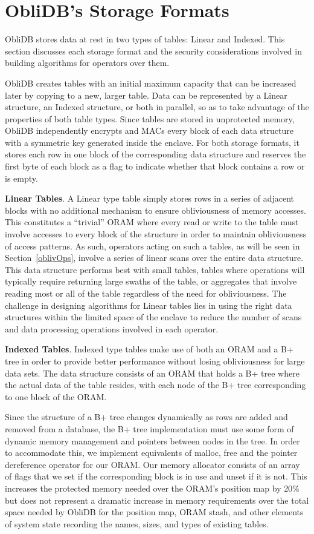 \documentclass[letterpaper,twocolumn,10pt]{article}
\def\name/{ObliDB}
\begin{document}
\section{\name/'s Storage Formats}\label{oblivData}
\name/ stores data at rest in two types of tables: Linear and Indexed. This section discusses each storage format and the security considerations involved in building algorithms for operators over them.

\name/ creates tables with an initial maximum capacity that can be increased later by copying to a new, larger table. Data can be represented by a Linear structure, an Indexed structure, or both in parallel, so as to take advantage of the properties of both table types. Since tables are stored in unprotected memory, \name/ independently encrypts and MACs every block of each data structure with a symmetric key generated inside the enclave. For both storage formats, it stores each row in one block of the corresponding data structure and reserves the first byte of each block as a flag to indicate whether that block contains a row or is empty.

 \noindent \textbf{Linear Tables}. A Linear type table simply stores rows in a series of adjacent blocks with no additional mechanism to ensure obliviousness of memory accesses. This constitutes a ``trivial'' ORAM where every read or write to the table must involve accesses to every block of the structure in order to maintain obliviousness of access patterns. As such, operators acting on such a tables, as will be seen in Section~\ref{oblivOps}, involve a series of linear scans over the entire data structure. This data structure performs best with small tables, tables where operations will typically require returning large swaths of the table, or aggregates that involve reading most or all of the table regardless of the need for obliviousness. The challenge in designing algorithms for Linear tables lies in using the right data structures within the limited space of the enclave to reduce the number of scans and data processing operations involved in each operator.

 \noindent \textbf{Indexed Tables}. Indexed type tables make use of both an ORAM and a B+ tree in order to provide better performance without losing obliviousness for large data sets. The data structure consists of an ORAM that holds a B+ tree where the actual data of the table resides, with each node of the B+ tree corresponding to one block of the ORAM. 
 
Since the structure of a B+ tree changes dynamically as rows are added and removed from a database, the B+ tree implementation must use some form of dynamic memory management and pointers between nodes in the tree. In order to accommodate this, we implement equivalents of malloc, free and the pointer dereference operator for our ORAM. Our memory allocator consists of an array of flags that we set if the corresponding block is in use and unset if it is not. This increases the protected memory needed over the ORAM's position map by 20\% but does not represent a dramatic increase in memory requirements over the total space needed by \name/ for the position map, ORAM stash, and other elements of system state recording the names, sizes, and types of existing tables. 
 
\end{document}
